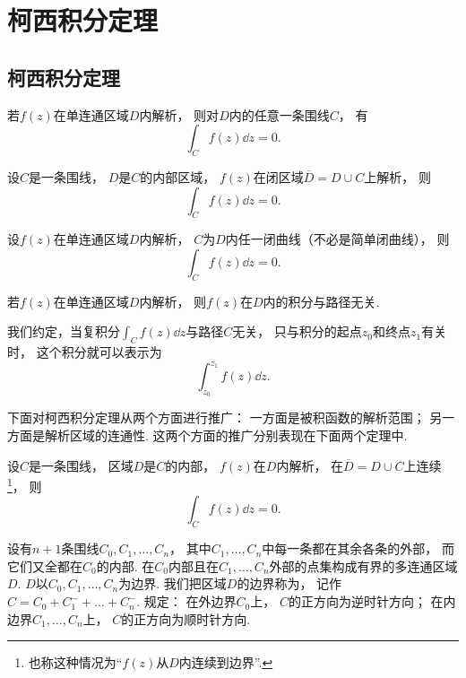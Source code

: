 \section{柯西积分定理}
\subsection{柯西积分定理}
\begin{theorem}[柯西积分定理]\label{theorem:解析函数的积分表示.柯西积分定理}
若\(f(z)\)在单连通区域\(D\)内解析，
则对\(D\)内的任意一条围线\(C\)，
有\[
	\int_C f(z) \dd{z} = 0.
\]
\end{theorem}

\begin{theorem}\label{theorem:解析函数的积分表示.柯西积分定理.闭区域的情形}
设\(C\)是一条围线，
\(D\)是\(C\)的内部区域，
\(f(z)\)在闭区域\(\overline{D}=D \cup C\)上解析，
则\[
	\int_C f(z) \dd{z} = 0.
\]
\end{theorem}

\begin{corollary}\label{theorem:解析函数的积分表示.柯西积分定理.非简单闭曲线的情形}
设\(f(z)\)在单连通区域\(D\)内解析，
\(C\)为\(D\)内任一闭曲线（不必是简单闭曲线），
则\[
	\int_C f(z) \dd{z} = 0.
\]
\end{corollary}

\begin{corollary}\label{theorem:解析函数的积分表示.解析函数在解析区域内的积分与路径无关}
若\(f(z)\)在单连通区域\(D\)内解析，
则\(f(z)\)在\(D\)内的积分与路径无关.
\end{corollary}

我们约定，当复积分\(\int_C f(z) \dd{z}\)与路径\(C\)无关，
只与积分的起点\(z_0\)和终点\(z_1\)有关时，
这个积分就可以表示为\[
	\int_{z_0}^{z_1} f(z) \dd{z}.
\]

下面对柯西积分定理从两个方面进行推广：
一方面是被积函数的解析范围；
另一方面是解析区域的连通性.
这两个方面的推广分别表现在下面两个定理中.
\begin{theorem}
设\(C\)是一条围线，
区域\(D\)是\(C\)的内部，
\(f(z)\)在\(D\)内解析，
在\(\overline{D}=D \cup C\)上连续\footnote{也称这种情况为“\(f(z)\)从\(D\)内连续到边界”.}，
则\[
	\int_C f(z) \dd{z} = 0.
\]
\end{theorem}

\begin{definition}
设有\(n+1\)条围线\(C_0,C_1,\dots,C_n\)，
其中\(C_1,\dots,C_n\)中每一条都在其余各条的外部，
而它们又全都在\(C_0\)的内部.
在\(C_0\)内部且在\(C_1,\dots,C_n\)外部的点集构成有界的多连通区域\(D\).
\(D\)以\(C_0,C_1,\dots,C_n\)为边界.
我们把区域\(D\)的边界称为，
记作\(C=C_0+C_1^-+\dots+C_n^-\).
规定：
在外边界\(C_0\)上，
\(C\)的正方向为逆时针方向；
在内边界\(C_1,\dots,C_n\)上，
\(C\)的正方向为顺时针方向.
\end{definition}

